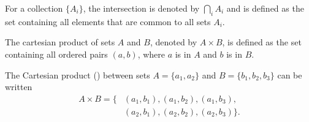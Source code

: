 \begin{definition}
	For a collection $\{A_i\}$, the intersection is denoted by $\bigcap_{i} A_i$ and is defined as the set containing all elements that are common to all sets $A_i$.
\end{definition}

\begin{definition}
	\label{def:cartesian_product}
	The cartesian product of sets $A$ and $B$, denoted by $A \times B$, is defined as the set containing all ordered pairs $(a, b)$, where $a$ is in $A$ and $b$ is in $B$.
\end{definition}

\begin{example}
	The Cartesian product () between sets $A = \{a_1, a_2\}$ and $B = \{b_1, b_2, b_3\}$ can be written
	\begin{equation}
		\begin{split}
			A\times B = \{&(a_1,b_1),(a_1,b_2),(a_1,b_3),\\
			&(a_2,b_1),(a_2,b_2),(a_2,b_3)\}.
		\end{split}
	\end{equation}
\end{example}

	
